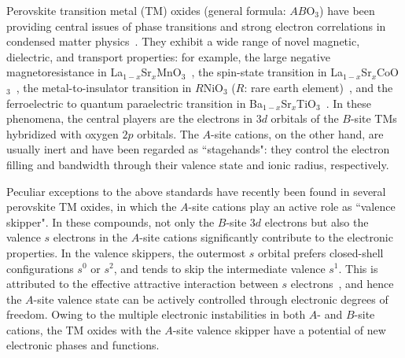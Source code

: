\documentclass[aps,twocolumn,prl,showpacs,preprintnumbers,amsmath,amssymb]{revtex4}
\begin{document}


Perovskite transition metal (TM) oxides (general formula: $AB$O$_3$) have been providing central issues of phase transitions and strong electron correlations in condensed matter physics~\cite{Imada, Cheong}. 
They exhibit a wide range of novel magnetic, dielectric, and transport properties: for example, the large negative magnetoresistance in La$_{1-x}$Sr$_{x}$MnO$_3$~\cite{Chahara, Helmolt, Tokura}, the spin-state transition in La$_{1-x}$Sr$_{x}$CoO$_3$~\cite{Korotin, Saitoh}, the metal-to-insulator transition in $R$NiO$_3$ ($R$: rare earth element)~\cite{Torrance}, and the ferroelectric to quantum paraelectric transition in Ba$_{1-x}$Sr$_x$TiO$_3$~\cite{Sawaguchi, Zhou}. 
In these phenomena, the central players are the electrons in $3d$ orbitals of the $B$-site TMs hybridized with oxygen $2p$ orbitals.
The $A$-site cations, on the other hand, are usually inert and have been regarded as ``stagehands": 
they control the electron filling and bandwidth through their valence state and ionic radius, respectively. 

Peculiar exceptions to the above standards have recently been found in several perovskite TM oxides, in which the $A$-site cations play an active role as ``valence skipper". 
In these compounds, 
not only the $B$-site $3d$ electrons  but also the valence $s$ electrons in the $A$-site cations significantly contribute to the electronic properties. 
In the valence skippers, the outermost $s$ orbital prefers closed-shell configurations $s^{0}$ or $s^{2}$, and tends to skip the intermediate valence $s^{1}$. 
This is attributed to the effective attractive interaction between $s$ electrons~\cite{Varma, Anderson, Hase}, and hence the $A$-site valence state can be actively controlled through electronic degrees of freedom. 
Owing to the multiple electronic instabilities in both $A$- and $B$-site cations, the TM oxides with the $A$-site valence skipper have a potential of new electronic phases and functions. 
\end{document}
